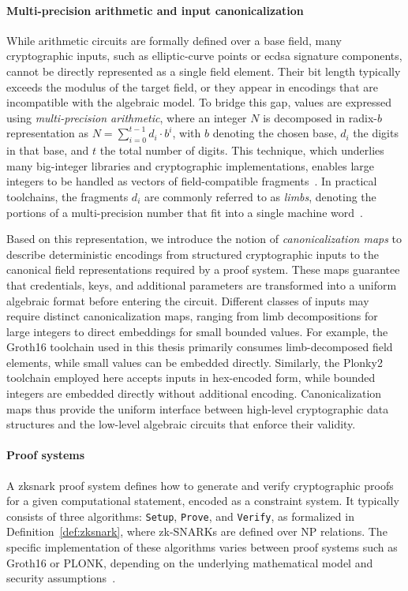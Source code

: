 \paragraph{Multi-precision arithmetic and input canonicalization}
While arithmetic circuits are formally defined over a base field, many cryptographic inputs, such as elliptic-curve points or \acrshort{ecdsa} signature components, cannot be directly represented as a single field element. Their bit length typically exceeds the modulus of the target field, or they appear in encodings that are incompatible with the algebraic model. To bridge this gap, values are expressed using \emph{multi-precision arithmetic}, where an integer $N$ is decomposed in radix-$b$ representation as $N = \sum_{i=0}^{t-1} d_i \cdot b^i$, with $b$ denoting the chosen base, $d_i$ the digits in that base, and $t$ the total number of digits. This technique, which underlies many big-integer libraries and cryptographic implementations, enables large integers to be handled as vectors of field-compatible fragments~\cite{menezes1996hac}. In practical toolchains, the fragments $d_i$ are commonly referred to as \emph{limbs}, denoting the portions of a multi-precision number that fit into a single machine word~\cite{gmp}.

Based on this representation, we introduce the notion of \emph{canonicalization maps} to describe deterministic encodings from structured cryptographic inputs to the canonical field representations required by a proof system. These maps guarantee that credentials, keys, and additional parameters are transformed into a uniform algebraic format before entering the circuit. Different classes of inputs may require distinct canonicalization maps, ranging from limb decompositions for large integers to direct embeddings for small bounded values. For example, the Groth16 toolchain used in this thesis primarily consumes limb-decomposed field elements, while small values can be embedded directly. Similarly, the Plonky2 toolchain employed here accepts inputs in hex-encoded form, while bounded integers are embedded directly without additional encoding. Canonicalization maps thus provide the uniform interface between high-level cryptographic data structures and the low-level algebraic circuits that enforce their validity.

\paragraph{Proof systems}
A \acrshort{zksnark} proof system defines how to generate and verify cryptographic proofs for a given computational statement, encoded as a constraint system. It typically consists of three algorithms: \texttt{Setup}, \texttt{Prove}, and \texttt{Verify}, as formalized in Definition~\ref{def:zksnark}, where zk-SNARKs are defined over NP relations. The specific implementation of these algorithms varies between proof systems such as Groth16 or PLONK, depending on the underlying mathematical model and security assumptions~\cite{groth2016size, liang2025}.

